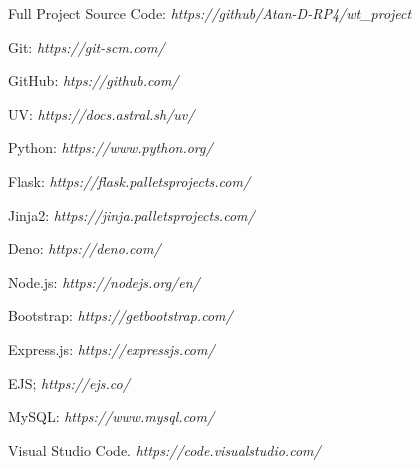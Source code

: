\begin{thebibliography}{9}
  Full Project Source Code: \textit{https://github/Atan-D-RP4/wt\_project}

  Git: \textit{https://git-scm.com/}

  GitHub: \textit{htps://github.com/}

  UV: \textit{https://docs.astral.sh/uv/}

  Python: \textit{https://www.python.org/}

  Flask: \textit{https://flask.palletsprojects.com/}

  Jinja2: \textit{https://jinja.palletsprojects.com/}

  Deno: \textit{https://deno.com/}

  Node.js: \textit{https://nodejs.org/en/}

    Bootstrap: \textit{https://getbootstrap.com/}

  Express.js: \textit{https://expressjs.com/}

  EJS; \textit{https://ejs.co/}

  MySQL: \textit{https://www.mysql.com/}

  Visual Studio Code. \textit{https://code.visualstudio.com/}
\end{thebibliography}
